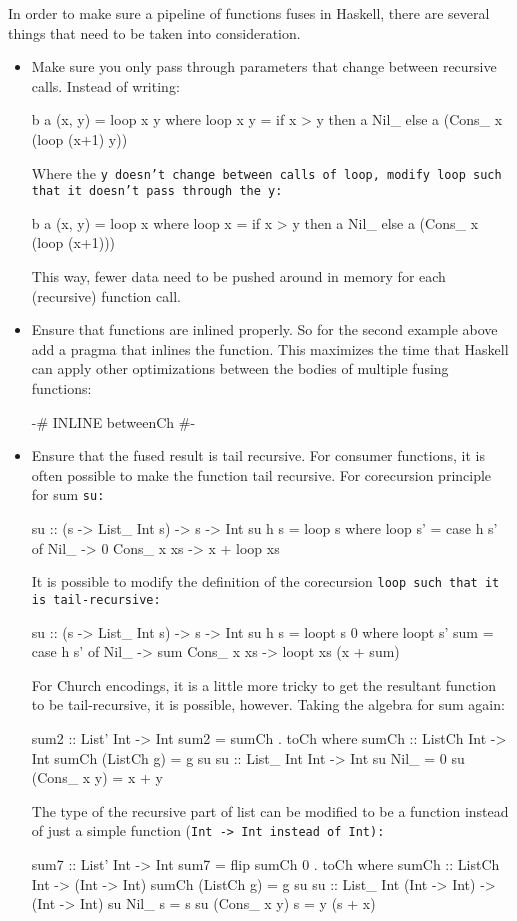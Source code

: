 In order to make sure a pipeline of functions fuses in Haskell, there are several things that need to be taken into consideration.
\begin{itemize}[noitemsep]
    \item Make sure you only pass through parameters that change between recursive calls. Instead of writing:
    \begin{spec}
b a (x, y) = loop x y
  where loop x y = if x > y
                   then a Nil_
                   else a (Cons_ x (loop (x+1) y))
    \end{spec}
    Where the \tt{y} doesn't change between calls of \tt{loop}, modify \tt{loop} such that it doesn't pass through the \tt{y}:
    \begin{spec}
b a (x, y) = loop x
  where loop x = if x > y
                 then a Nil_
                 else a (Cons_ x (loop (x+1)))
    \end{spec}
    This way, fewer data need to be pushed around in memory for each (recursive) function call.
    \item Ensure that functions are inlined properly. So for the second example above add a pragma that inlines the function.
    This maximizes the time that Haskell can apply other optimizations between the bodies of multiple fusing functions:
    \begin{spec}
        {-# INLINE betweenCh #-}
    \end{spec}
    \item Ensure that the fused result is tail recursive.
    For consumer functions, it is often possible to make the function tail recursive.
    For corecursion principle for sum \tt{su}:
    \begin{spec}
su :: (s -> List_ Int s) -> s -> Int
su h s = loop s
  where loop s' = case h s' of
          Nil_ -> 0
                          Cons_ x xs -> x + loop xs
    \end{spec}
    It is possible to modify the definition of the corecursion \tt{loop} such that it is tail-recursive:
    \begin{spec}
su :: (s -> List_ Int s) -> s -> Int
su h s = loopt s 0
  where loopt s' sum = case h s' of
          Nil_ -> sum
                          Cons_ x xs -> loopt xs (x + sum)
    \end{spec}
    For Church encodings, it is a little more tricky to get the resultant function to be tail-recursive, it is possible, however.
    Taking the algebra for sum again:
    \begin{spec}
sum2 :: List' Int -> Int
sum2 = sumCh . toCh
  where sumCh :: ListCh Int -> Int
        sumCh (ListCh g) = g su
        su :: List_ Int Int -> Int
        su Nil_ = 0
        su (Cons_ x y) = x + y
\end{spec}
    The type of the recursive part of list can be modified to be a function instead of just a simple function (\tt{Int -> Int} instead of \tt{Int}):
\begin{spec}
sum7 :: List' Int -> Int
sum7 = flip sumCh 0 . toCh
  where sumCh :: ListCh Int -> (Int -> Int)
        sumCh (ListCh g) = g su
        su :: List_ Int (Int -> Int) -> (Int -> Int)
        su Nil_ s = s
        su (Cons_ x y) s = y (s + x)
    \end{spec}


\end{itemize}
